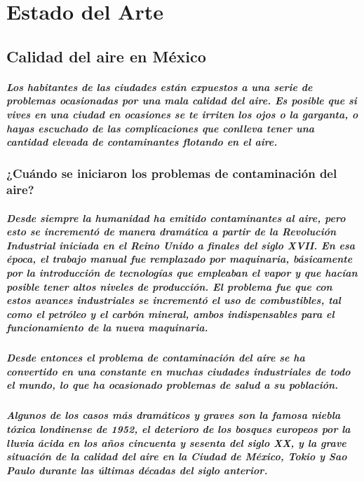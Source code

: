 \chapter {Estado del Arte}
\section {Calidad del aire en México}
\paragraph {Los habitantes de las ciudades están expuestos a una serie de problemas ocasionadas por una mala calidad del aire. Es posible que si vives en una ciudad en  ocasiones se te irriten los ojos o la garganta, o hayas escuchado de las complicaciones que conlleva tener una cantidad elevada de contaminantes flotando en el aire.}
\subsection{¿Cuándo se iniciaron los problemas de contaminación del aire?}
\paragraph {Desde siempre la humanidad ha emitido contaminantes al aire, pero esto se incrementó de manera dramática a partir de la Revolución Industrial iniciada en el Reino Unido a finales del siglo XVII. En esa época, el trabajo manual fue remplazado por maquinaria, básicamente por la introducción de tecnologías que empleaban el vapor y que hacían posible tener altos niveles de producción. El problema fue que con estos avances industriales se incrementó el  uso de combustibles, tal como el petróleo y el carbón mineral, ambos indispensables para el funcionamiento de la nueva maquinaria.}
\paragraph {Desde entonces el problema de contaminación del aire se ha convertido en una constante en muchas ciudades industriales de todo el mundo, lo que ha ocasionado problemas de salud a su población.}
\paragraph {Algunos de los casos más dramáticos y graves son la famosa niebla tóxica londinense de 1952, el deterioro de los bosques europeos por la lluvia ácida en los años cincuenta y sesenta del siglo XX, y la grave situación de la calidad del aire en la Ciudad de México, Tokio y Sao Paulo durante las últimas décadas del siglo anterior. }
